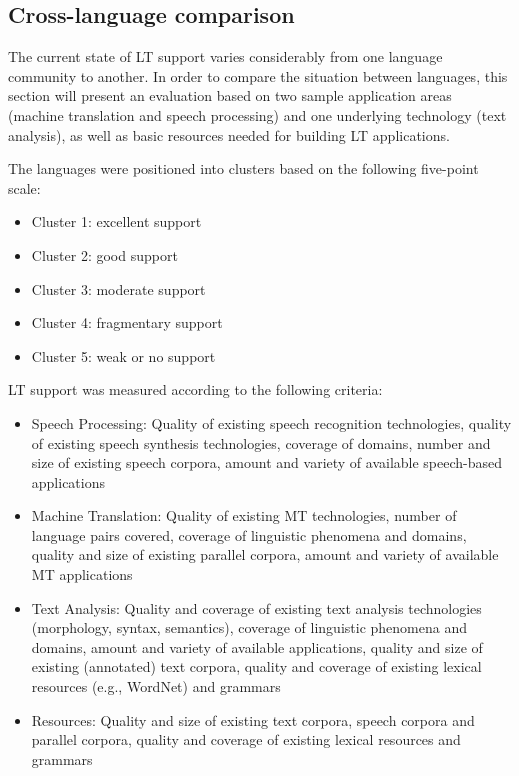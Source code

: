 \documentclass[]{../../metanetpaper}
\begin{document}
\begin{multicols}{2}
\subsection{Cross-language comparison}

The current state of LT support varies considerably from one language
community to another. In order to compare the situation between
languages, this section will present an evaluation based on two sample
application areas (machine translation and speech processing) and one
underlying technology (text analysis), as well as basic resources
needed for building LT applications.

The languages were positioned into clusters based on the following
five-point scale:
\begin{itemize}
\item[] Cluster 1: excellent support
\item[] Cluster 2: good support
\item[] Cluster 3: moderate support
\item[] Cluster 4: fragmentary support
\item[] Cluster 5: weak or no support
\end{itemize}

LT support was measured according to the following criteria:
\begin{itemize}
\item Speech Processing: Quality of existing speech recognition
       technologies, quality of existing speech synthesis
       technologies, coverage of domains, number and size of existing
       speech corpora, amount and variety of available speech-based
       applications
\item Machine Translation: Quality of existing MT technologies, number
       of language pairs covered, coverage of linguistic phenomena and
       domains, quality and size of existing parallel corpora, amount
       and variety of available MT applications

\item Text Analysis: Quality and coverage of existing text analysis
       technologies (morphology, syntax, semantics), coverage of
       linguistic phenomena and domains, amount and variety of
       available applications, quality and size of existing
       (annotated) text corpora, quality and coverage of existing
       lexical resources (e.g., WordNet) and grammars
\item Resources: Quality and size of existing text corpora, speech
       corpora and parallel corpora, quality and coverage of existing
       lexical resources and grammars
\end{itemize}


\end{multicols}
\end{document}
